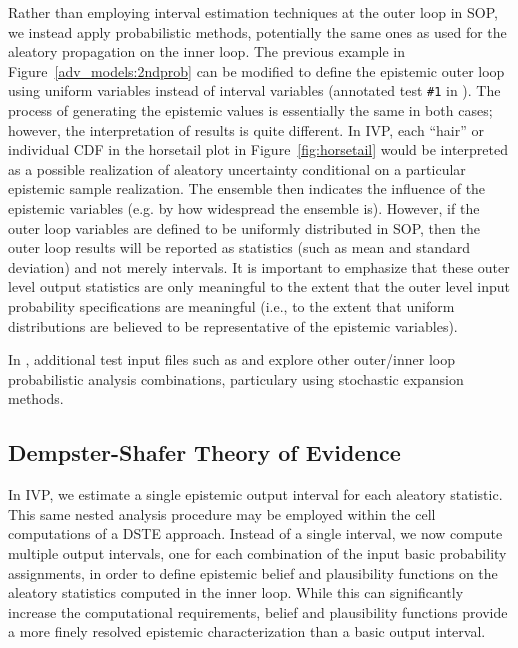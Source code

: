 Rather than employing interval estimation techniques at the outer loop
in SOP, we instead apply probabilistic methods, potentially the same
ones as used for the aleatory propagation on the inner loop. 
The previous example in Figure~\ref{adv_models:2ndprob} can be
modified to define the epistemic outer loop using uniform variables
instead of interval variables (annotated test \texttt{\#1} in
). The process of
generating the epistemic values is essentially the same in both cases;
however, the interpretation of results is quite different. In IVP,
each ``hair'' or individual CDF in the horsetail plot in
Figure~\ref{fig:horsetail} would be interpreted as a possible
realization of aleatory uncertainty conditional on a particular
epistemic sample realization. The ensemble then indicates the
influence of the epistemic variables (e.g. by how widespread the
ensemble is). However, if the outer loop variables are defined to be
uniformly distributed in SOP, then the outer loop results will be
reported as statistics (such as mean and standard deviation) and not
merely intervals. It is important to emphasize that these outer level
output statistics are only meaningful to the extent that the outer
level input probability specifications are meaningful (i.e., to the
extent that uniform distributions are believed to be representative 
of the epistemic variables).

In , additional test input files such as
 and
 explore other outer/inner
loop probabilistic analysis combinations, particulary using stochastic
expansion methods.

\subsection{Dempster-Shafer Theory of Evidence} \label{adv_models:mixed_uq:dste}

In IVP, we estimate a single epistemic output interval for each
aleatory statistic. This same nested analysis procedure may be
employed within the cell computations of a DSTE approach. Instead of
a single interval, we now compute multiple output intervals, one for
each combination of the input basic probability assignments, in order
to define epistemic belief and plausibility functions on the aleatory
statistics computed in the inner loop. While this can significantly
increase the computational requirements, belief and plausibility
functions provide a more finely resolved epistemic characterization
than a basic output interval.

